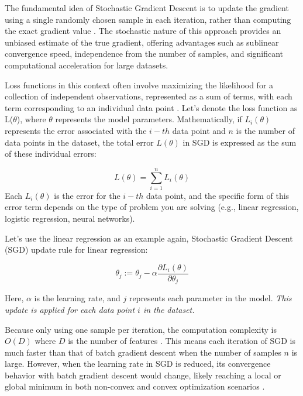 \documentclass[12pt,a4paper]{article}
\begin{document}
The fundamental idea of Stochastic Gradient Descent is to update the gradient using a single randomly chosen sample in each iteration, rather than computing the exact gradient value \cite{optimization}. The stochastic nature of this approach provides an unbiased estimate of the true gradient, offering advantages such as sublinear convergence speed, independence from the number of samples, and significant computational acceleration for large datasets.

Loss functions in this context often involve maximizing the likelihood for a collection of independent observations, represented as a sum of terms, with each term corresponding to an individual data point \cite{SGD}. Let's denote the loss function as L(\(\theta\)), where $\theta$ represents the model parameters. Mathematically, if $L_i(\theta)$ represents the error associated with the $i-th$ data point and $n$ is the number of data points in the dataset, the total error $L(\theta)$ in SGD is expressed as the sum of these individual errors:

\begin{equation}
	L(\theta) = \sum_{i=1}^{n} L_i(\theta)	
\end{equation}
Each $L_i(\theta)$ is the error for the $i-th$ data point, and the specific form of this error term depends on the type of problem you are solving (e.g., linear regression, logistic regression, neural networks). 

Let's use the linear regression as an example again, Stochastic Gradient Descent (SGD) update rule for linear regression:

\begin{equation}
	\theta_j := \theta_j - \alpha \frac{\partial L_i(\theta)}{\partial \theta_j}
\end{equation}

Here, \(\alpha\) is the learning rate, and \(j\) represents each parameter in the model. \textit{This update is applied for each data point \(i\) in the dataset.}

Because only using one sample per iteration, the computation complexity is $O(D)$ where $D$ is the number of features \cite{optimization}. This means each iteration of SGD is much faster than that of batch gradient descent when the number of samples $n$ is large. However, when the learning rate in SGD is reduced, its convergence behavior with batch gradient descent would change, likely reaching a local or global minimum in both non-convex and convex optimization scenarios \cite{GD}. 
\end{document}

